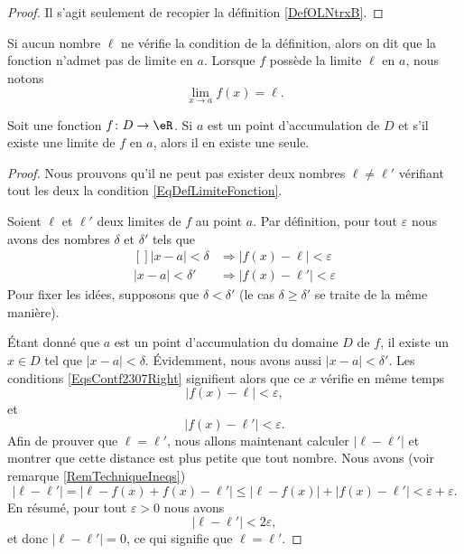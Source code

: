 \begin{proof}
    Il s'agit seulement de recopier la définition \ref{DefOLNtrxB}.
\end{proof}

Si aucun nombre $\ell$ ne vérifie la condition de la définition, alors on dit que la fonction n'admet pas de limite en $a$. Lorsque $f$ possède la limite $\ell$ en $a$, nous notons
\begin{equation}
	\lim_{x\to a} f(x)=\ell.
\end{equation}

\begin{proposition}
	Soit une fonction $f\colon D\to \eR$. Si $a$ est un point d'accumulation de $D$ et s'il existe une limite de $f$ en $a$, alors il en existe une seule. 
\end{proposition}


\begin{proof}
    Nous prouvons qu'il ne peut pas exister deux nombres $\ell\neq\ell'$ vérifiant tout les deux la condition \eqref{EqDefLimiteFonction}.
    
	Soient $\ell$ et $\ell'$ deux limites de $f$ au point $a$. Par définition, pour tout $\varepsilon$ nous avons des nombres $\delta$ et $\delta'$ tels que
	\begin{equation}	\label{EqsContf2307Right}
		\begin{aligned}[]
			| x-a |<\delta&\Rightarrow \big| f(x)-\ell \big|<\varepsilon\\
			| x-a |<\delta'&\Rightarrow \big| f(x)-\ell' \big|<\varepsilon
		\end{aligned}
	\end{equation}
	Pour fixer les idées, supposons que $\delta<\delta'$ (le cas $\delta\geq\delta'$ se traite de la même manière).

	Étant donné que $a$ est un point d'accumulation du domaine $D$ de $f$, il existe un $x\in D$ tel que $| x-a |<\delta$. Évidemment, nous avons aussi $| x-a |<\delta'$. Les conditions \eqref{EqsContf2307Right} signifient alors que ce $x$ vérifie en même temps
	\begin{equation}
		| f(x)-\ell |<\varepsilon,
	\end{equation}
	et
	\begin{equation}
		| f(x)-\ell' |<\varepsilon.
	\end{equation}
	Afin de prouver que $\ell=\ell'$, nous allons maintenant calculer $| \ell-\ell' |$ et montrer que cette distance est plus petite que tout nombre. Nous avons (voir remarque \ref{RemTechniqueIneqs})
	\begin{equation}	\label{EqInesq2307ellellepr}
		| \ell-\ell' |=| \ell-f(x)+f(x)-\ell' |\leq | \ell-f(x) |+| f(x)-\ell' |<\varepsilon+\varepsilon.
	\end{equation}
	En résumé, pour tout $\varepsilon>0$ nous avons
	\begin{equation}
		| \ell-\ell' |<2\varepsilon,
	\end{equation}
	et donc $| \ell-\ell' |=0$, ce qui signifie que $\ell=\ell'$.
\end{proof}

